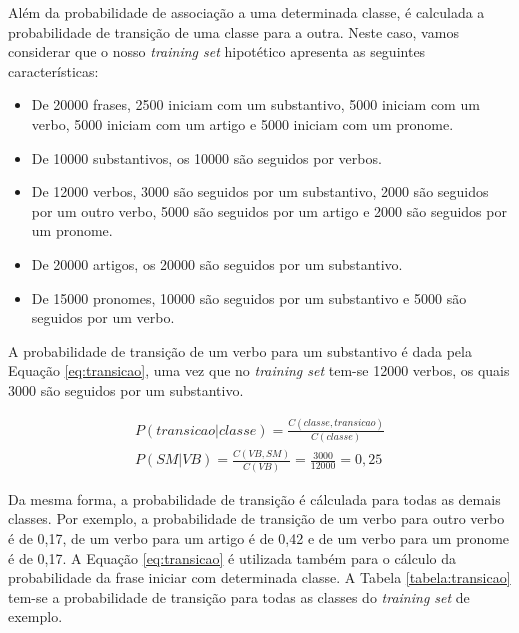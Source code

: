 Além da probabilidade de associação a uma determinada classe, é calculada a
probabilidade de transição de uma classe para a outra. Neste caso, vamos
considerar que o nosso \textit{training set} hipotético apresenta as seguintes
características:

\begin{itemize}
  \item De 20000 frases, 2500 iniciam com um substantivo, 5000 iniciam com um
  verbo, 5000 iniciam com um artigo e 5000 iniciam com um pronome.
  \item De 10000 substantivos, os 10000
  são seguidos por verbos.
  \item De 12000 verbos, 3000 são seguidos por um substantivo, 2000
  são seguidos por um outro verbo, 5000 são seguidos por um artigo e 2000 são
  seguidos por um pronome.
  \item De 20000 artigos, os 20000 são seguidos por um substantivo.
  \item De 15000 pronomes, 10000 são seguidos por um substantivo e 5000 são
  seguidos por um verbo.
  
  
\end{itemize}

A probabilidade de transição de um verbo para um substantivo é dada
pela Equação \ref{eq:transicao}, uma vez que no \textit{training set} tem-se
12000 verbos, os quais 3000 são seguidos por um substantivo.

\begin{equation}
\begin{split}
P(transicao|classe) = \frac{C(classe,transicao)}{C(classe)} \\
P(SM|VB) = \frac{C(VB,SM)}{C(VB)} = \frac{3000}{12000} = 0,25
\end{split}
\label{eq:transicao}
\end{equation}

Da mesma forma, a probabilidade de transição é cálculada para todas as
demais classes. Por exemplo, a probabilidade de
transição de um verbo para outro verbo é de 0,17, de um verbo para um artigo é
de 0,42 e de um verbo para um pronome é de 0,17. A Equação
\ref{eq:transicao} é utilizada também para o cálculo da probabilidade da frase
iniciar com determinada classe.
A Tabela \ref{tabela:transicao} tem-se a probabilidade de transição para todas
as classes do \textit{training set} de exemplo.


\newpage

